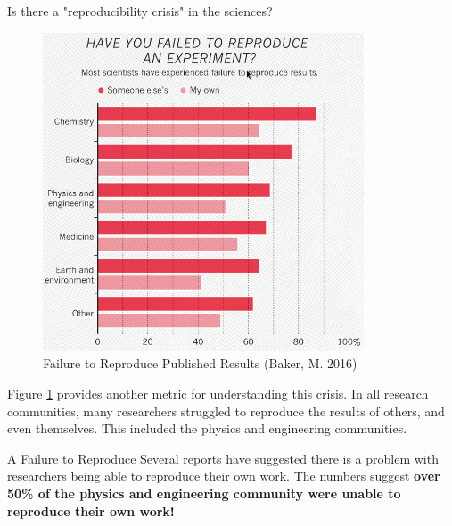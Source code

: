 \documentclass[final]{beamer}
\newlength{\colwidth}
\begin{document}
\begin{frame}[t]
\begin{columns}[t]
\begin{column}{\colwidth}
\begin{block}{Is there a "reproducibility crisis" in the sciences?}
    \begin{figure}
      \centering
      \includegraphics[width=0.85\textwidth]{tess2024/Nature-Reproducibility-Failure-.png}
      \caption{Failure to Reproduce Published Results (Baker, M. 2016)}
      \label{fig:failure}
    \end{figure}
    
    Figure \ref*{fig:failure} provides another metric for understanding this
    crisis.
    In all research communities, many researchers struggled to reproduce the
    results of others, and even themselves.
    This included the physics and engineering communities.

  \end{block}

  \begin{alertblock}{A Failure to Reproduce}
    Several reports have suggested there is a problem with researchers being
    able to reproduce their own work.
    The numbers suggest \textbf{over 50\% of the physics and engineering community
    were unable to reproduce their own work!}

  \end{alertblock}


\end{column}
\end{columns}
\end{frame}
\end{document}

